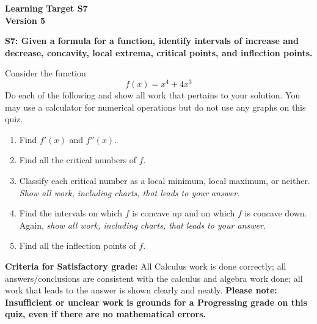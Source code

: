 \documentclass[10pt]{article}
\begin{document}
	\vspace*{0in}

		\begin{center}
			\textbf{Learning Target S7 \\
			Version 5} 
		\end{center}


\begin{framed}
	\textbf{S7: Given a formula for a function, identify intervals of increase and decrease, concavity, local extrema, critical points, and inflection points.}
\end{framed}

Consider the function 
$$f\left( x \right) = x^4 + 4x^3$$
Do each of the following and show all work that pertains to your solution. You may use a calculator for numerical operations but do not use any graphs on this quiz. 
\begin{enumerate}
    \item Find $f'(x)$ and $f''(x)$. 
    \item Find all the critical numbers of $f$.
    \item Classify each critical number as a local minimum, local maximum, or neither. \emph{Show all work, including charts, that leads to your answer.} 
    \item Find the intervals on which $f$ is concave up and on which $f$ is concave down. Again, \emph{show all work, including charts, that leads to your answer.} 
    \item Find all the inflection points of $f$. 
\end{enumerate}

\vfill


\begin{small}
    \begin{framed}
        	\textbf{Criteria for Satisfactory grade:} All Calculus work is done correctly; all answers/conclusions are consistent with the calculus and algebra work done; all work that leads to the answer is shown clearly and neatly. \textbf{Please note: Insufficient or unclear work is grounds for a Progressing grade on this quiz, even if there are no mathematical errors.}
    \end{framed}

\end{small}
\end{document}
